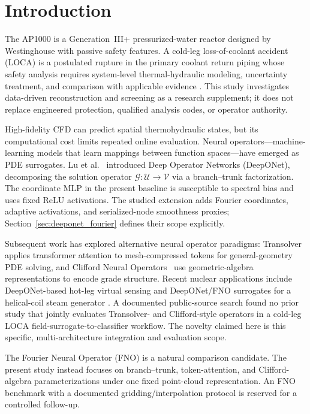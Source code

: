 \documentclass[journal]{IEEEtran}
\newcommand{\added}[1]{#1}
\begin{document}
\section{Introduction}

\added{The AP1000 is a Generation~III+ pressurized-water reactor designed by Westinghouse with passive safety features. A cold-leg loss-of-coolant accident (LOCA) is a postulated rupture in the primary coolant return piping whose safety analysis requires system-level thermal-hydraulic modeling, uncertainty treatment, and comparison with applicable evidence \cite{wecdcd,nrc_loca}. This study investigates data-driven reconstruction and screening as a research supplement; it does not replace engineered protection, qualified analysis codes, or operator authority.}

\added{High-fidelity CFD can predict spatial thermohydraulic states, but its computational cost limits repeated online evaluation.} Neural operators---machine-learning models that learn mappings between function spaces---have emerged as PDE surrogates. Lu et al.~\cite{lu2021deeponet} introduced Deep Operator Networks (DeepONet), decomposing the solution operator $\mathcal{G}: \mathcal{U} \to \mathcal{V}$ via a branch--trunk factorization. \added{The coordinate MLP in the present baseline is susceptible to spectral bias \cite{rahaman2019spectral} and uses fixed ReLU activations. The studied extension adds Fourier coordinates, adaptive activations, and serialized-node smoothness proxies; Section~\ref{sec:deeponet_fourier} defines their scope explicitly.}

Subsequent work has explored alternative neural operator paradigms: Transolver~\cite{wu2024transolver} applies transformer attention to mesh-compressed tokens for general-geometry PDE solving, and Clifford Neural Operators~\cite{brandstetter2023clifford} use geometric-algebra representations to encode grade structure. \added{Recent nuclear applications include DeepONet-based hot-leg virtual sensing and DeepONet/FNO surrogates for a helical-coil steam generator \cite{hossain2025virtual,lee2026hcsg}. A documented public-source search found no prior study that jointly evaluates Transolver- and Clifford-style operators in a cold-leg LOCA field-surrogate-to-classifier workflow. The novelty claimed here is this specific, multi-architecture integration and evaluation scope.}

\added{The Fourier Neural Operator (FNO) \cite{li2021fno} is a natural comparison candidate. The present study instead focuses on branch--trunk, token-attention, and Clifford-algebra parameterizations under one fixed point-cloud representation. An FNO benchmark with a documented gridding/interpolation protocol is reserved for a controlled follow-up.}
\end{document}
